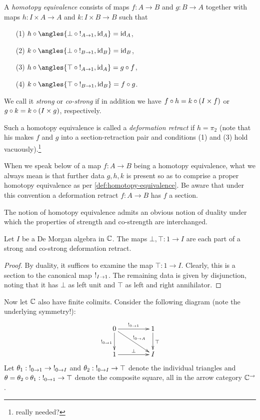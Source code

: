 \documentclass[reqno,10pt,a4paper,oneside]{amsart}
\begin{document}
\begin{definition}
\label{def:homotopy-equivalence}
A \emph{homotopy equivalence} consists of maps $f : A \to B$ and $g : B \to A$ together with maps $h : I \times A \to A$ and $k : I \times B \to B$ such that
\begin{itemize}
\item[(1)] $h \cc \angles{\bot \cc \canonical_{A \to 1}, \id_A} = \id_A$,
\item[(2)] $k \cc \angles{\bot \cc \canonical_{B \to 1}, \id_B} = \id_B$,
\item[(3)] $h \cc \angles{\top \cc \canonical_{A \to 1}, \id_A} = g \cc f$,
\item[(4)] $k \cc \angles{\top \cc \canonical_{B \to 1}, \id_B} = f \cc g$.
\end{itemize}
We call it \emph{strong} or \emph{co-strong} if in addition we have $f \mathbin{\circ} h = k \mathbin{\circ} (I \times f)$ or $g \mathbin{\circ} k = k \mathbin{\circ} (I \times g)$, respectively.

Such a homotopy equivalence is called a \emph{deformation retract} if $h = \pi_2$ (note that his makes $f$ and $g$ into a section-retraction pair and conditions (1) and (3) hold vacuously).\footnote{really needed?}
\end{definition}

When we speak below of a map $f : A \to B$ being a homotopy equivalence, what we always mean is that further data $g, h, k$ is present so as to comprise a proper homotopy equivalence as per \cref{def:homotopy-equivalence}.
Be aware that under this convention a deformation retract $f : A \to B$ has $f$ a section.

The notion of homotopy equivalence admits an obvious notion of duality under which the properties of strength and co-strength are interchanged.

\begin{example}
\label{de-morgan-deformation-retract}
Let $I$ be a De Morgan algebra in $\mathbb{C}$.
The maps $\bot, \top : 1 \to I$ are each part of a strong and co-strong deformation retract.
\end{example}

\begin{proof}
By duality, it suffices to examine the map $\top : 1 \to I$.
Clearly, this is a section to the canonical map $\mathord{!}_{I \to 1}$.
The remaining data is given by disjunction, noting that it has $\bot$ as left unit and $\top$ as left and right annihilator.
\end{proof}

Now let $\mathbb{C}$ also have finite colimits.
Consider the following diagram (note the underlying symmetry!):
\[
\xymatrix@C+2em{
  0
  \ar[r]^{\canonical_{0 \to 1}}
  \ar[d]_{\canonical_{0 \to 1}}
  \ar[dr]^{\canonical_{0 \to A}}
&
  1
  \ar[d]^{\top}
\\
  1
  \ar[r]^{\bot}
&
  I
}
\]
Let $\theta_1 : \mathord{!}_{0 \to 1} \to \mathord{!}_{0 \to I}$ and $\theta_2 : \mathord{!}_{0 \to I} \to \top$ denote the individual triangles and $\theta = \theta_2 \mathbin{\circ} \theta_1 : \mathord{!}_{0 \to 1} \to \top$ denote the composite square, all in the arrow category $\mathbb{C}^{\to}$.
\end{document}
